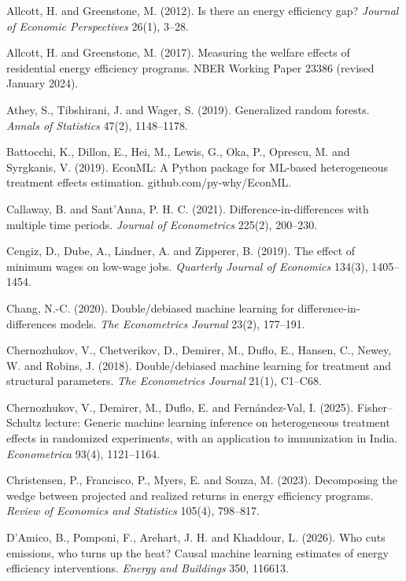 \documentclass[11pt,a4paper]{article}
\providecommand{\tightlist}{\setlength{\itemsep}{0pt}\setlength{\parskip}{0pt}}
\begin{document}
\begin{list}{}{\setlength{\leftmargin}{1.5em}\setlength{\itemindent}{-1.5em}\setlength{\itemsep}{2pt}}
\tightlist
\item
  Allcott, H. and Greenstone, M. (2012). Is there an energy efficiency gap? \emph{Journal of Economic Perspectives} 26(1), 3--28.
\item
  Allcott, H. and Greenstone, M. (2017). Measuring the welfare effects of residential energy efficiency programs. NBER Working Paper 23386 (revised January 2024).
\item
  Athey, S., Tibshirani, J. and Wager, S. (2019). Generalized random forests. \emph{Annals of Statistics} 47(2), 1148--1178.
\item
  Battocchi, K., Dillon, E., Hei, M., Lewis, G., Oka, P., Oprescu, M. and Syrgkanis, V. (2019). EconML: A Python package for ML-based heterogeneous treatment effects estimation. github.com/py-why/EconML.
\item
  Callaway, B. and Sant'Anna, P. H. C. (2021). Difference-in-differences with multiple time periods. \emph{Journal of Econometrics} 225(2), 200--230.
\item
  Cengiz, D., Dube, A., Lindner, A. and Zipperer, B. (2019). The effect of minimum wages on low-wage jobs. \emph{Quarterly Journal of Economics} 134(3), 1405--1454.
\item
  Chang, N.-C. (2020). Double/debiased machine learning for difference-in-differences models. \emph{The Econometrics Journal} 23(2), 177--191.
\item
  Chernozhukov, V., Chetverikov, D., Demirer, M., Duflo, E., Hansen, C., Newey, W. and Robins, J. (2018). Double/debiased machine learning for treatment and structural parameters. \emph{The Econometrics Journal} 21(1), C1--C68.
\item
  Chernozhukov, V., Demirer, M., Duflo, E. and Fernández-Val, I. (2025). Fisher--Schultz lecture: Generic machine learning inference on heterogeneous treatment effects in randomized experiments, with an application to immunization in India. \emph{Econometrica} 93(4), 1121--1164.
\item
  Christensen, P., Francisco, P., Myers, E. and Souza, M. (2023). Decomposing the wedge between projected and realized returns in energy efficiency programs. \emph{Review of Economics and Statistics} 105(4), 798--817.
\item
  D'Amico, B., Pomponi, F., Arehart, J. H. and Khaddour, L. (2026). Who cuts emissions, who turns up the heat? Causal machine learning estimates of energy efficiency interventions. \emph{Energy and Buildings} 350, 116613.

\end{list}
\end{document}
